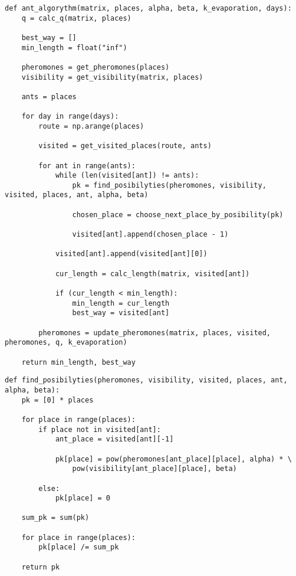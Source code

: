 \clearpage

\begin{center}
    \captionsetup{justification=raggedright,singlelinecheck=off}
    \begin{lstlisting}[label=lst:ant_alg,caption=Муравьиный алгоритм]
def ant_algorythm(matrix, places, alpha, beta, k_evaporation, days):
	q = calc_q(matrix, places)

	best_way = []
	min_length = float("inf")

	pheromones = get_pheromones(places)
	visibility = get_visibility(matrix, places)

	ants = places

	for day in range(days):
		route = np.arange(places)

		visited = get_visited_places(route, ants)

		for ant in range(ants):
			while (len(visited[ant]) != ants):
				pk = find_posibilyties(pheromones, visibility, visited, places, ant, alpha, beta)  

				chosen_place = choose_next_place_by_posibility(pk)

				visited[ant].append(chosen_place - 1)
		
			visited[ant].append(visited[ant][0])

			cur_length = calc_length(matrix, visited[ant]) 

			if (cur_length < min_length):
				min_length = cur_length
				best_way = visited[ant]

		pheromones = update_pheromones(matrix, places, visited, pheromones, q, k_evaporation)

	return min_length, best_way
\end{lstlisting}
\end{center}


\clearpage


\begin{center}
    \captionsetup{justification=raggedright,singlelinecheck=off}
    \begin{lstlisting}[label=lst:prob_arr,caption=Алгоритм нахождения массива вероятностных переходов в непосещенные города]
def find_posibilyties(pheromones, visibility, visited, places, ant, alpha, beta):
	pk = [0] * places

	for place in range(places):
		if place not in visited[ant]:
			ant_place = visited[ant][-1]

			pk[place] = pow(pheromones[ant_place][place], alpha) * \
				pow(visibility[ant_place][place], beta)
		
		else:
			pk[place] = 0

	sum_pk = sum(pk)

	for place in range(places):
		pk[place] /= sum_pk  

	return pk
\end{lstlisting}
\end{center}

